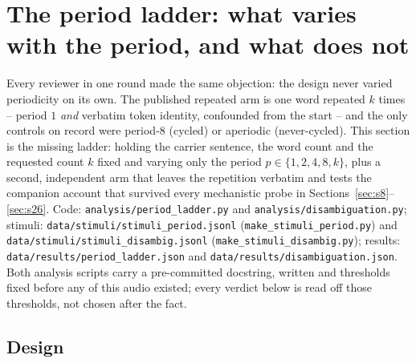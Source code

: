 \documentclass[11pt]{article}
\begin{document}
\section{The period ladder: what varies with the period, and what does not}
\label{sec:s28}

Every reviewer in one round made the same objection: the design never varied
periodicity on its own. The published repeated arm is one word repeated $k$
times -- period $1$ \emph{and} verbatim token identity, confounded from the
start -- and the only controls on record were period-$8$ (cycled) or aperiodic
(never-cycled). This section is the missing ladder: holding the carrier
sentence, the word count and the requested count $k$ fixed and varying only the
period $p\in\{1,2,4,8,k\}$, plus a second, independent arm that leaves the
repetition verbatim and tests the companion account that survived every
mechanistic probe in Sections~\ref{sec:s8}--\ref{sec:s26}. Code:
\texttt{analysis/period\_ladder.py} and \texttt{analysis/disambiguation.py};
stimuli: \texttt{data/stimuli/stimuli\_period.jsonl}
(\texttt{make\_stimuli\_period.py}) and
\texttt{data/stimuli/stimuli\_disambig.jsonl}
(\texttt{make\_stimuli\_disambig.py}); results:
\texttt{data/results/period\_ladder.json} and
\texttt{data/results/disambiguation.json}. Both analysis scripts carry a
pre-committed docstring, written and thresholds fixed before any of this
audio existed; every verdict below is read off those thresholds, not chosen
after the fact.

\subsection{Design}
\end{document}
